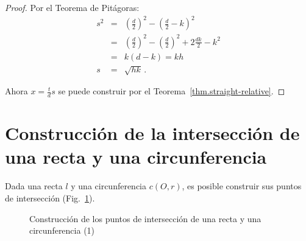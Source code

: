 \begin{proof}
Por el Teorema de Pitágoras:
\begin{eqnarray*}
s^2&=& \left(\frac{d}{2}\right)^2 - \left(\frac{d}{2}-k\right)^2\\
&=& \left(\frac{d}{2}\right)^2 - \left(\frac{d}{2}\right)^2 + 2\frac{dk}{2} - k^2\\
&=& k(d-k) = kh\\
s&=&\sqrt{hk}\,.
\end{eqnarray*}

Ahora $x=\displaystyle\frac{t}{d}s$ se puede construir por el Teorema~\ref{thm.straight-relative}.
\end{proof}

\section{Construcción de la intersección de una recta y una circunferencia}\label{s.line-circle-straight}

\begin{theorem}
Dada una recta $l$ y una circunferencia $c(O,r)$, es posible construir sus puntos de intersección (Fig.~\ref{f.se-line-circle1}).
\end{theorem}
\begin{figure}[t]
\begin{center}
\end{center}
\caption{Construcción de los puntos de intersección de una recta y una circunferencia (1)}\label{f.se-line-circle1}
\end{figure}

